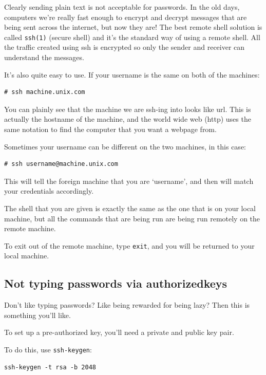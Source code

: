 Clearly sending plain text is not acceptable for passwords. In the old days, computers we're
really fast enough to encrypt and decrypt messages that are being sent across the internet,
but now they are! The best remote shell solution is called {\tt ssh(1)} (secure shell) and it's 
the standard way of using a remote shell. All the traffic created using ssh is encrypted so only the 
sender and receiver can understand
the messages. 

It's also quite easy to use. If your username is the same on both of the machines:

\begin{verbatim}
# ssh machine.unix.com
\end{verbatim}    

You can plainly see that the machine we are ssh-ing into looks like url. This is 
actually the hostname of the machine, and the world wide web (http) uses the same
notation to find the computer that you want a webpage from.

Sometimes your username can be different on the two machines, in this case:

\begin{verbatim}
# ssh username@machine.unix.com 
\end{verbatim}

This will tell the foreign machine that you are `username', and then will
match your credentials accordingly. 

The shell that you are given is exactly the same as the one that is on your local 
machine, but all the commands that are being run are being run 
remotely on the remote machine.

To exit out of the remote machine, type {\tt exit}, and you will be returned 
to your local machine.  

\subsection{Not typing passwords via authorized\textunderscore keys}

Don't like typing passwords? Like being rewarded for being lazy? Then this 
is something you'll like.

To set up a pre-authorized key, you'll need a private and public key pair.

To do this, use {\tt ssh-keygen}:

\begin{verbatim}
ssh-keygen -t rsa -b 2048
\end{verbatim}

